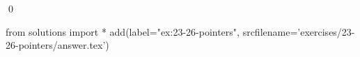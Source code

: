 
\begin{ex}
  \label{ex:23-26-pointers}
  
  \qed
\end{ex}
\begin{python0}
from solutions import *
add(label="ex:23-26-pointers",
    srcfilename='exercises/23-26-pointers/answer.tex')
\end{python0}
